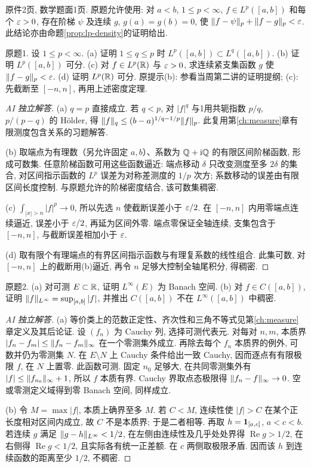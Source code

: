 \label{sec:ps07}
原件2页, 数学题面1页. 原题允许使用: 对 $a<b$, $1\le p<\infty$, $f\in L^p([a,b])$ 和每个 $\varepsilon>0$, 存在阶梯 $\psi$ 及连续 $g$, $g(a)=g(b)=0$, 使 $\lVert f-\psi\rVert_p+\lVert f-g\rVert_p<\varepsilon$. 此结论亦由命题\ref{prop:lp-density}的证明给出.
\begin{exercise}\label{ps07:1}
原题1. 设 $1\le p<\infty$. (a) 证明 $1\le q\le p$ 时 $L^p([a,b])\subset L^q([a,b])$. (b) 证明 $L^p([a,b])$ 可分. (c) 对 $f\in L^p(\mathbb R)$ 与 $\varepsilon>0$, 求连续紧支集函数 $g$ 使 $\lVert f-g\rVert_p<\varepsilon$. (d) 证明 $L^p(\mathbb R)$ 可分. 原提示(b): 参看当周第二讲的证明提纲; (c): 先截断至 $[-n,n]$, 再用上述密度定理.
\end{exercise}
\begin{proof}[AI 独立解答]
(a) $q=p$ 直接成立. 若 $q<p$, 对 $|f|^q$ 与1用共轭指数 $p/q$, $p/(p-q)$ 的 Hölder, 得 $\lVert f\rVert_q\le(b-a)^{1/q-1/p}\lVert f\rVert_p$. 此复用第\ref{ch:measure}章有限测度包含关系的习题解答.

(b) 取端点为有理数（另允许固定 $a,b$）、系数为 $\mathbb Q+\mathrm i\mathbb Q$ 的有限区间阶梯函数, 形成可数集. 任意阶梯函数可用这些函数逼近: 端点移动 $\delta$ 只改变测度至多 $2\delta$ 的集合, 对区间指示函数的 $L^p$ 误差为对称差测度的 $1/p$ 次方; 系数移动的误差由有限区间长度控制. 与原题允许的阶梯密度结合, 该可数集稠密.

(c) $\int_{|x|>n}|f|^p\to0$, 所以先选 $n$ 使截断误差小于 $\varepsilon/2$. 在 $[-n,n]$ 内用零端点连续逼近, 误差小于 $\varepsilon/2$, 再延为区间外零. 端点零保证全轴连续, 支集包含于 $[-n,n]$, 与截断误差相加小于 $\varepsilon$.

(d) 取有限个有理端点的有界区间指示函数与有理复系数的线性组合. 此集可数, 对 $[-n,n]$ 上的截断用(b)逼近, 再令 $n$ 足够大控制全轴尾积分, 得稠密.
\end{proof}
\begin{exercise}\label{ps07:2}
原题2. (a) 对可测 $E\subset\mathbb R$, 证明 $L^\infty(E)$ 为 Banach 空间. (b) 对 $f\in C([a,b])$, 证明 $\lVert f\rVert_{L^\infty}=\sup_{[a,b]}|f|$, 并推出 $C([a,b])$ 不在 $L^\infty([a,b])$ 中稠密.
\end{exercise}
\begin{proof}[AI 独立解答]
(a) 等价类上的范数正定性、齐次性和三角不等式见第\ref{ch:measure}章定义及其后论证. 设 $(f_n)$ 为 Cauchy 列, 选择可测代表元. 对每对 $n,m$, 本质界 $|f_n-f_m|\le\lVert f_n-f_m\rVert_\infty$ 在一个零测集外成立. 再除去每个 $f_n$ 本质界的例外, 可数并仍为零测集 $N$. 在 $E\setminus N$ 上 Cauchy 条件给出一致 Cauchy, 因而逐点有有限极限 $f$, 在 $N$ 上置零. 此函数可测. 固定 $n_0$ 足够大, 在共同零测集外有 $|f|\le\lVert f_{n_0}\rVert_\infty+1$, 所以 $f$ 本质有界. Cauchy 界取点态极限得 $\lVert f_n-f\rVert_\infty\to0$. 空或零测定义域得到零 Banach 空间, 同样成立.

(b) 令 $M=\max|f|$, 本质上确界至多 $M$. 若 $C<M$, 连续性使 $|f|>C$ 在某个正长度相对区间内成立, 故 $C$ 不是本质界; 于是二者相等. 再取 $h=\mathbf 1_{[a,c]}$, $a<c<b$. 若连续 $g$ 满足 $\lVert g-h\rVert_{L^\infty}<1/2$, 在左侧由连续性及几乎处处界得 $\operatorname{Re}g>1/2$, 在右侧得 $\operatorname{Re}g<1/2$, 且实际各有统一正差额. 在 $c$ 两侧取极限矛盾. 因而该 $h$ 到连续函数的距离至少 $1/2$, 不稠密.
\end{proof}
